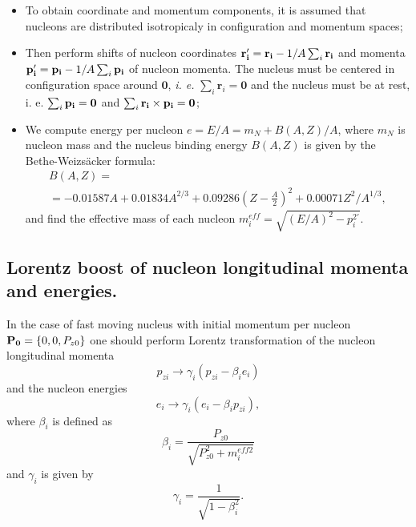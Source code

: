 \begin{itemize}
\item To obtain coordinate and momentum components, it
 is assumed that nucleons are distributed isotropicaly in configuration
 and momentum spaces;

\item Then perform shifts of nucleon coordinates ${\bf r_i^{\prime}}
= {\bf r_i} - 1/A \sum_i {\bf r_i}$ and momenta ${\bf p_i^{\prime}}
= {\bf p_i} - 1/A \sum_i {\bf p_i}$ 
of nucleon momenta. The nucleus must be centered in configuration space around
$\mathbf{0}$, \textit{i. e.} $\sum_i {\mathbf{r}_i} = \mathbf{0}$ and
 the nucleus must be at rest, i. e. $\sum_i {\bf p_i} = \bf 0$ and
$\sum_i {\bf r_i} \times {\bf p_i}={\bf 0}$;

\item We compute energy per nucleon $e = E/A = m_{N} + B(A,Z)/A$, 
where $m_N$ is nucleon mass and the nucleus binding energy $B(A,Z)$ is given  
by the Bethe-Weizs\"acker formula\cite{BM69}:
\begin{equation}
\begin{array}{c}
\label{NIS6} B(A,Z) = \\
= -0.01587A + 0.01834A^{2/3} + 0.09286(Z- \frac{A}{2})^2 +
0.00071 Z^2/A^{1/3},
\end{array}
\end{equation} 
 and find the effective mass of each nucleon $m^{eff}_i = 
\sqrt{(E/A)^2 - p^{2\prime}_i}$.
\end{itemize}

\subsection{Lorentz boost of nucleon longitudinal momenta and energies.}

\hspace{1.0em}In the case of fast moving nucleus with initial momentum
per nucleon ${\bf P_0}= \{0, 0, P_{z0}\}$ one should perform Lorentz
transformation of the nucleon longitudinal momenta
\begin{equation}
\label{NIS7}  p_{zi} \rightarrow \gamma_i (p_{zi} - \beta_i e_{i})
\end{equation}
and the nucleon energies 
\begin{equation}
\label{NIS8} e_{i} \rightarrow \gamma_i (e_{i} - \beta_i p_{zi}),
\end{equation}
where $\beta_{i}$ is defined as
\begin{equation}
\label{NIS9} \beta_{i} = \frac{P_{z0}}{\sqrt{P_{z0}^2 + m^{eff2}_i}}
\end{equation}
and $\gamma_i$ is given by 
\begin{equation}
\label{NIS10}\gamma_i = \frac{1}{\sqrt{1 - \beta_i^2}}.
\end{equation}

